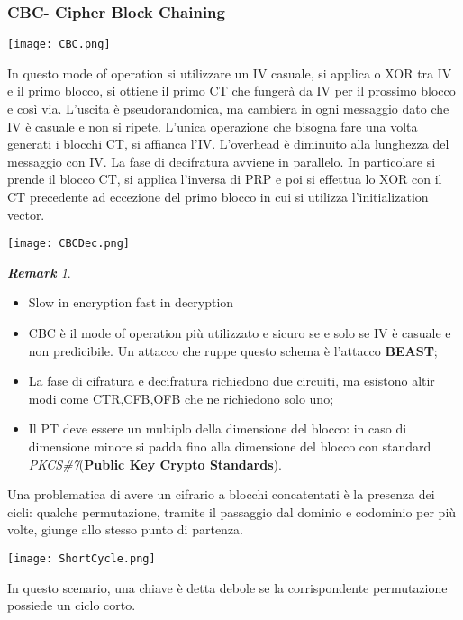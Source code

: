\documentclass{article}
\theoremstyle{remark}
\newtheorem*{remark}{\textbf{Remark}}
\begin{document}
\subsubsection{CBC- Cipher Block Chaining}
\begin{center}
	\texttt{[image: CBC.png]}
\end{center}
In questo mode of operation si utilizzare un IV casuale, si applica o XOR tra IV e il primo blocco, si ottiene il primo CT che fungerà da IV per il prossimo blocco e così via. L'uscita è pseudorandomica, ma cambiera in ogni messaggio dato che IV è casuale e non si ripete. L'unica operazione che bisogna fare una volta generati i blocchi CT, si affianca l'IV.\newline
L'overhead è diminuito alla lunghezza del messaggio con IV.\newline
La fase di decifratura avviene in parallelo. In particolare si prende il blocco CT, si applica l'inversa di PRP e poi si effettua lo XOR con il CT precedente ad eccezione del primo blocco in cui si utilizza l'initialization vector.
\begin{center}
	\texttt{[image: CBCDec.png]}
\end{center}
\begin{remark}
	\begin{itemize}
		\item Slow in encryption fast in decryption
		\item CBC è il mode of operation più utilizzato e sicuro se e solo se IV è casuale e non predicibile. Un attacco che ruppe questo schema è l'attacco \textbf{BEAST};
		\item La fase di cifratura e decifratura richiedono due circuiti, ma esistono altir modi come CTR,CFB,OFB che ne richiedono solo uno;
		\item Il PT deve essere un multiplo della dimensione del blocco: in caso di dimensione minore si padda fino alla dimensione del blocco con standard \emph{PKCS\#7}(\textbf{Public Key Crypto Standards}).
	\end{itemize}
\end{remark}\newpage
Una problematica di avere un cifrario a blocchi concatentati è la presenza dei cicli: qualche permutazione, tramite il passaggio dal dominio e codominio per più volte, giunge allo stesso punto di partenza.
\begin{center}
	\texttt{[image: ShortCycle.png]}
\end{center}
In questo scenario, una chiave è detta debole se la corrispondente permutazione possiede un ciclo corto.
\end{document}
